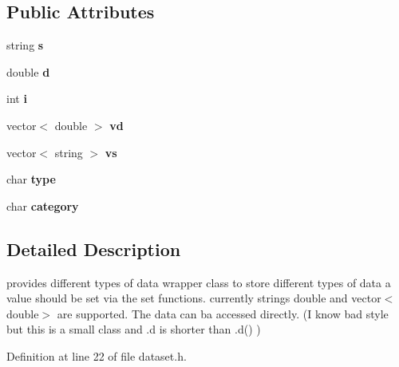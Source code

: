 \subsection*{Public Attributes}
\begin{DoxyCompactItemize}
\item 
\hypertarget{classm__entry_a3303f3002f302fedf38d17f2a00bd1c7}{
string {\bfseries s}}
\label{classm__entry_a3303f3002f302fedf38d17f2a00bd1c7}

\item 
\hypertarget{classm__entry_a455d38c5314b16576297baf448e315de}{
double {\bfseries d}}
\label{classm__entry_a455d38c5314b16576297baf448e315de}

\item 
\hypertarget{classm__entry_a82360b8f3ff1a2af271c7a04f5843cc6}{
int {\bfseries i}}
\label{classm__entry_a82360b8f3ff1a2af271c7a04f5843cc6}

\item 
\hypertarget{classm__entry_ab7bf71129d720abd62d813cce213d819}{
vector$<$ double $>$ {\bfseries vd}}
\label{classm__entry_ab7bf71129d720abd62d813cce213d819}

\item 
\hypertarget{classm__entry_a5a6e6ebadcfd29baebcbfc9e02fb9ec8}{
vector$<$ string $>$ {\bfseries vs}}
\label{classm__entry_a5a6e6ebadcfd29baebcbfc9e02fb9ec8}

\item 
\hypertarget{classm__entry_a61ffd6d35941c4938a21af5ba61c544a}{
char {\bfseries type}}
\label{classm__entry_a61ffd6d35941c4938a21af5ba61c544a}

\item 
\hypertarget{classm__entry_a24d6e1fa3b9a369ba70d7065000b9362}{
char {\bfseries category}}
\label{classm__entry_a24d6e1fa3b9a369ba70d7065000b9362}

\end{DoxyCompactItemize}


\subsection{Detailed Description}
provides different types of data wrapper class to store different types of data a value should be set via the set functions. currently strings double and vector$<$double$>$ are supported. The data can ba accessed directly. (I know bad style but this is a small class and .d is shorter than .d() ) 

Definition at line 22 of file dataset.h.



